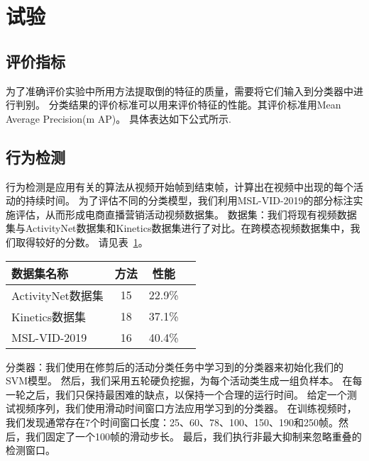 \section{试验}
\subsection{评价指标}

为了准确评价实验中所用方法提取倒的特征的质量，需要将它们输入到分类器中进行判别。
分类结果的评价标准可以用来评价特征的性能。其评价标准用Mean Average Precision(m AP)。
具体表达如下公式所示.

\subsection{行为检测}

行为检测是应用有关的算法从视频开始帧到结束帧，计算出在视频中出现的每个活动的持续时间。
为了评估不同的分类模型，我们利用MSL-VID-2019的部分标注实施评估，从而形成电商直播营销活动视频数据集。
数据集：我们将现有视频数据集与ActivityNet数据集和Kinetics数据集进行了对比。在跨模态视频数据集中，我们取得较好的分数。
请见表~\ref{tab:比较}。
\begin{table}[!htbp]
    \label{tab:比较}
    \centering
    \footnotesize%
    \setlength{\tabcolsep}{4pt}%
    \renewcommand{\arraystretch}{1.2}%
    \begin{tabular}{lccc}
        \hline
        数据集名称 & 方法 &性能}\\
        \hline
        ActivityNet数据集 & 15 & 22.9\%\\
        Kinetics数据集 & 18 & 37.1\%\\
        MSL-VID-2019 & 16 & 40.4\%\\
        \hline
    \end{tabular}
\end{table}

分类器：我们使用在修剪后的活动分类任务中学习到的分类器来初始化我们的SVM模型。
然后，我们采用五轮硬负挖掘，为每个活动类生成一组负样本。
在每一轮之后，我们只保持最困难的缺点，以保持一个合理的运行时间。
给定一个测试视频序列，我们使用滑动时间窗口方法应用学习到的分类器。
在训练视频时，我们发现通常存在7个时间窗口长度：25、60、78、100、150、190和250帧。然后，我们固定了一个100帧的滑动步长。
最后，我们执行非最大抑制来忽略重叠的检测窗口。

